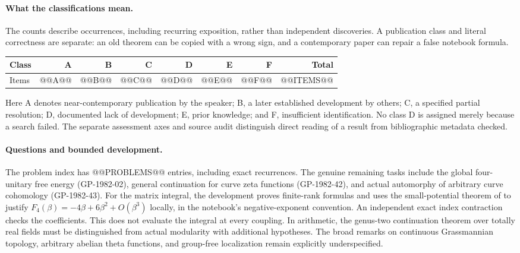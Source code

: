 \paragraph{What the classifications mean.}
The counts describe occurrences, including recurring exposition, rather than
independent discoveries. A publication class and literal correctness are
separate: an old theorem can be copied with a wrong sign, and a contemporary
paper can repair a false notebook formula.
\begin{center}
\begin{tabular}{@{}lrrrrrrr@{}}
\toprule
Class & A & B & C & D & E & F & Total\\
\midrule
Items & @@A@@ & @@B@@ & @@C@@ & @@D@@ & @@E@@ & @@F@@ & @@ITEMS@@\\
\bottomrule
\end{tabular}
\end{center}
Here A denotes near-contemporary publication by the speaker; B, a later
established development by others; C, a specified partial resolution; D,
documented lack of development; E, prior knowledge; and F, insufficient
identification. No class D is assigned merely because a search failed.
The separate assessment axes and source audit distinguish direct reading
of a result from bibliographic metadata checked.

\paragraph{Questions and bounded development.}
The problem index has @@PROBLEMS@@ entries, including exact recurrences.
The genuine remaining tasks include the global four-unitary free energy
(GP-1982-02), general continuation for curve zeta functions (GP-1982-42), and
actual automorphy of arbitrary curve cohomology (GP-1982-43).
For the matrix integral, the development proves finite-rank formulas and
uses the small-potential theorem of
\citet[Theorem~0.1]{collinsguionnetmaurel2009asymptotics} to justify
\(F_4(\beta)=-4\beta+6\beta^2+O(\beta^3)\) locally, in the notebook's
negative-exponent convention. An independent exact index contraction checks
the coefficients. This does not evaluate the integral at every coupling.
In arithmetic, the genus-two continuation theorem over totally real fields
\citep[Theorems~1.1.2--1.1.3]{boxercalegarigeepilloni2021surfaces}
must be distinguished from actual modularity with additional hypotheses.
The broad remarks on continuous Grassmannian topology, arbitrary abelian
theta functions, and group-free localization remain explicitly underspecified.


